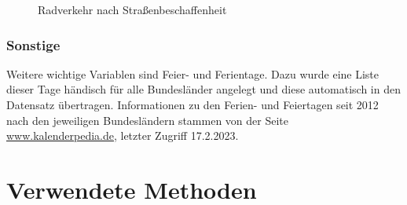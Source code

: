 \documentclass[a4paper,12pt]{thesis}
\begin{document}
\begin{figure}[!ht]%
	\centering
	\qquad
	\caption{Radverkehr nach Straßenbeschaffenheit}
	\label{VerkehrnachTypen}%
\end{figure}

\subsection{Sonstige}

Weitere wichtige Variablen sind Feier- und Ferientage. Dazu wurde eine Liste dieser Tage händisch für alle Bundesländer angelegt und diese automatisch in den Datensatz übertragen. Informationen zu den Ferien- und Feiertagen seit 2012 nach den jeweiligen Bundesländern stammen von der Seite \url{www.kalenderpedia.de}, letzter Zugriff 17.2.2023.

\chapter{Verwendete Methoden}
\end{document}
